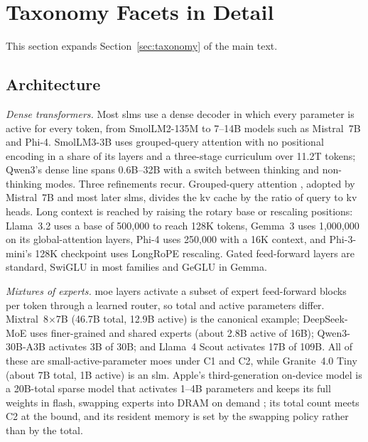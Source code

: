 
\section{Taxonomy Facets in Detail}
\label{supp:taxonomy}

This section expands Section~\ref{sec:taxonomy} of the main text.

\subsection{Architecture}
\label{supp:taxonomy_architecture}

\emph{Dense transformers.} Most \glspl{slm} use a dense decoder in which every parameter is active for every token, from SmolLM2-135M \citep{allal2025smollm2} to 7--14B models such as Mistral~7B \citep{jiang2023mistral} and Phi-4. SmolLM3-3B \citep{smollm3} uses grouped-query attention with no positional encoding in a share of its layers and a three-stage curriculum over 11.2T tokens; Qwen3's dense line \citep{qwen3_2025} spans 0.6B--32B with a switch between thinking and non-thinking modes. Three refinements recur. Grouped-query attention \citep{ainslie2023gqa}, adopted by Mistral~7B and most later \glspl{slm}, divides the \gls{kv} cache by the ratio of query to \gls{kv} heads. Long context is reached by raising the rotary base or rescaling positions: Llama~3.2 uses a base of 500{,}000 to reach 128K tokens, Gemma~3 uses 1{,}000{,}000 on its global-attention layers, Phi-4 uses 250{,}000 with a 16K context, and Phi-3-mini's 128K checkpoint uses LongRoPE rescaling. Gated feed-forward layers are standard, SwiGLU in most families and GeGLU in Gemma.

\emph{Mixtures of experts.} \gls{moe} layers \citep{shazeer2017moe,fedus2022switch} activate a subset of expert feed-forward blocks per token through a learned router, so total and active parameters differ. Mixtral~8$\times$7B \citep{jiang2024mixtral} (46.7B total, 12.9B active) is the canonical example; DeepSeek-MoE \citep{dai2024deepseekmoe} uses finer-grained and shared experts (about 2.8B active of 16B); Qwen3-30B-A3B \citep{qwen3_2025} activates 3B of 30B; and Llama~4 Scout \citep{llama4_2025} activates 17B of 109B. All of these are small-active-parameter \glspl{moe} under C1 and C2, while Granite~4.0 Tiny (about 7B total, 1B active) \citep{granite4_2025} is an \gls{slm}. Apple's third-generation on-device model is a 20B-total sparse model that activates 1--4B parameters and keeps its full weights in flash, swapping experts into DRAM on demand \citep{apple2026afm3}; its total count meets C2 at the bound, and its resident memory is set by the swapping policy rather than by the total.


